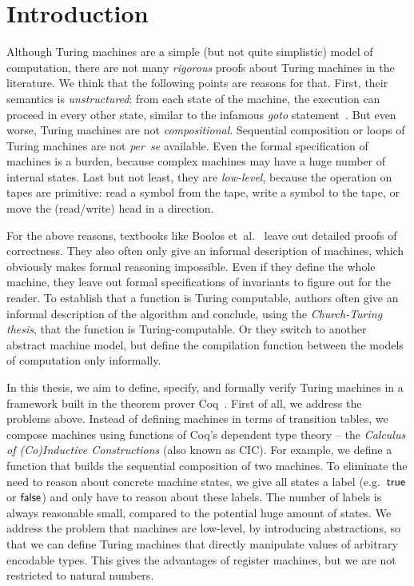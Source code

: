 \chapter{Introduction}
\label{chap:intro}


Although Turing machines are a simple (but not quite simplistic) model of computation, there are not many \textit{rigorous} proofs about Turing
machines in the literature.  We think that the following points are reasons for that.  First, their semantics is \textit{unstructured}: from each
state of the machine, the execution can proceed in every other state, similar to the infamous \textit{goto} statement~\cite{dijkstra2002go}.  But even
worse, Turing machines are not \textit{compositional}.  Sequential composition or loops of Turing machines are not \textit{per~se} available.  Even
the formal specification of machines is a burden, because complex machines may have a huge number of internal states.  Last but not least, they are
\textit{low-level}, because the operation on tapes are primitive: read a symbol from the tape, write a symbol to the tape, or move the (read/write)
head in a direction.

For the above reasons, textbooks like Boolos et~al.~\cite{boolos2007computability} leave out detailed proofs of correctness.  They also often only
give an informal description of machines, which obviously makes formal reasoning impossible.  Even if they define the whole machine, they leave out
formal specifications of invariants to figure out for the reader.  To establish that a function is Turing computable, authors often give an informal
description of the algorithm and conclude, using the \textit{Church-Turing thesis}, that the function is Turing-computable. Or they switch to another
abstract machine model, but define the compilation function between the models of computation only informally.

In this thesis, we aim to define, specify, and formally verify Turing machines in a framework built in the theorem prover Coq~\cite{Coq}.  First of
all, we address the problems above.  Instead of defining machines in terms of transition tables, we compose machines using functions of Coq's
dependent type theory -- the \textit{Calculus of (Co)Inductive Constructions} (also known as CIC).  For example, we define a function that builds the
sequential composition of two machines.  To eliminate the need to reason about concrete machine states, we give all states a label (e.g.\ $\mathsf{true}$ or
$\mathsf{false}$) and only have to reason about these labels.  The number of labels is always reasonable small, compared to the potential huge amount of
states.  We address the problem that machines are low-level, by introducing abstractions, so that we can define Turing machines that directly
manipulate values of arbitrary encodable types.  This gives the advantages of register machines, but we are not restricted to natural numbers.


